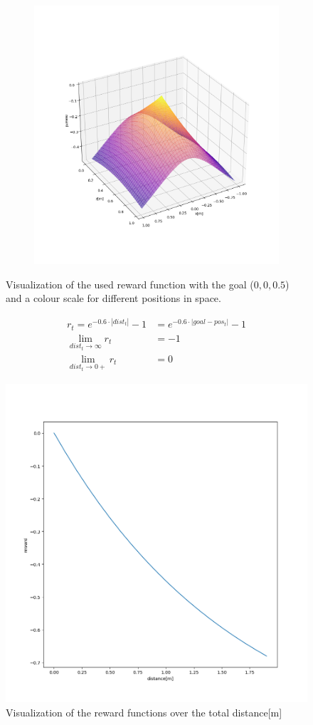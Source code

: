 \begin{figure}
\begin{subfigure}{0.3\linewidth}
		\caption{}
	\end{subfigure}
	\begin{subfigure}{0.3\linewidth}
		\includegraphics[width=\linewidth]{figures/rewXZ.png}
		\caption{}
	\end{subfigure}
	\caption{Visualization of the used reward function with the goal ($0,0,0.5$) and a colour scale for different positions in space.}
\end{figure}

\begin{align}
	r_t = e^{-0.6 \cdot |dist_t|} - 1 &= e^{-0.6 \cdot |goal - pos_t|} - 1 \label{eq:rew}\\
	\lim_{dist_t \to \infty} r_t &= -1\\
	\lim_{dist_t \to 0+} r_t &= 0
\end{align}

\newpage

\begin{figure}
	\centering
	\includegraphics[width= 0.5\linewidth]{figures/reward.png}
	\caption{Visualization of the reward functions over the total distance[m]}
\end{figure}

